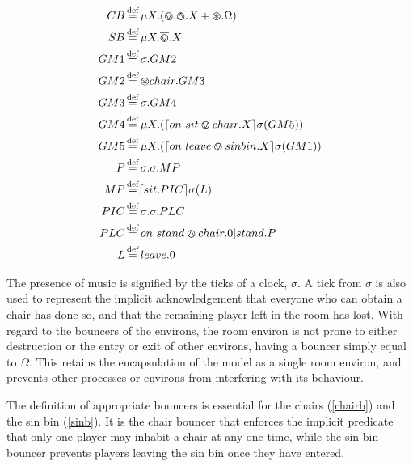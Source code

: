 \begin{table}[h]
  \caption{Summary of Processes and Derived Syntax for Musical Chairs}
  \label{tab:musicalchairs}
  \shrule
  \begin{align}
   CB &
    \operatorname{\stackrel{\textrm{def}}{=}} 
    \mu X.(\overline{\varovee}.\overline{\varowedge}.X + \overline{\varoast}.\Omega) \label{chairb} \\
   SB &
    \operatorname{\stackrel{\textrm{def}}{=}} 
    \mu X.\overline{\varovee}.X \label{sinb} \\
   GM1 &
    \operatorname{\stackrel{\textrm{def}}{=}} 
    \sigma.GM2 \label{gmstage2} \\
    GM2 &
    \operatorname{\stackrel{\textrm{def}}{=}} 
    \varoast chair.GM3 \label{gmstage3} \\
   GM3 &
   \operatorname{\stackrel{\textrm{def}}{=}}
   \sigma.GM4 \label{gmstage4} \\
   GM4 &
    \operatorname{\stackrel{\textrm{def}}{=}}  
    \mu X.(\lceil{on\ sit \varovee chair.X}\rceil {\sigma} ({GM5})) \label{gmstage5} \\
   GM5 &
    \operatorname{\stackrel{\textrm{def}}{=}} 
    \mu X.(\lceil{on\ leave \varovee sinbin.X}\rceil {\sigma} ({GM1})) \label{gmstage6}\\
    P &
    \operatorname{\stackrel{\textrm{def}}{=}} 
    \sigma.\sigma.MP \label{player} \\
    MP &
    \operatorname{\stackrel{\textrm{def}}{=}}
    \lceil{sit.PIC}\rceil {\sigma} ({L}) \label{mplayer}\\
   PIC &
    \operatorname{\stackrel{\textrm{def}}{=}} 
    \sigma.\sigma.PLC \label{pinchair} \\
   PLC &
   \operatorname{\stackrel{\textrm{def}}{=}}
   on\ stand \varowedge chair.0|stand.P \label{pleavechair} \\
   L &
    \operatorname{\stackrel{\textrm{def}}{=}} 
    leave.0 \label{loser} 
  \end{align}
  \shrule
\end{table}

The presence of music is signified by the ticks of a clock, $\sigma$.  A
tick from $\sigma$ is also used to represent the implicit
acknowledgement that everyone who can obtain a chair has done so, and
that the remaining player left in the room has lost.  With regard to the
bouncers of the environs, the room environ is not prone to either
destruction or the entry or exit of other environs, having a bouncer
simply equal to $\Omega$.  This retains the encapsulation of the model
as a single room environ, and prevents other processes or environs
from interfering with its behaviour.

The definition of appropriate bouncers is essential for the chairs
(\ref{chairb}) and the sin bin (\ref{sinb}).  It is the chair bouncer
that enforces the implicit predicate that only one player may inhabit a
chair at any one time, while the sin bin bouncer prevents players
leaving the sin bin once they have entered.

